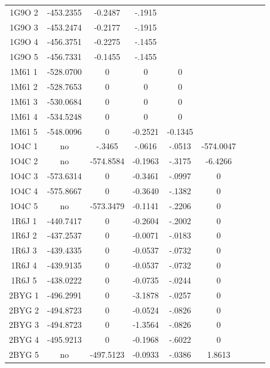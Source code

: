 \documentclass[a4paper,12pt]{article}
\begin{document}
\begin{table}[h]
\begin{tabular}{|c|c|c|c|c|c|c|c|c|}
        1G9O 2 & -453.2355 & -0.2487 & -.1915 \\      
        1G9O 3 & -453.2474 & -0.2177 & -.1915 \\      
        1G9O 4 & -456.3751 & -0.2275 & -.1455 \\      
        1G9O 5 & -456.7331 & -0.1455 & -.1455 \\      
        1M61 1 & -528.0700 & 0 & 0 & 0 \\             
        1M61 2 & -528.7653 & 0 & 0 & 0 \\             
        1M61 3 & -530.0684 & 0 & 0 & 0 \\             
        1M61 4 & -534.5248 & 0 & 0 & 0 \\             
        1M61 5 & -548.0096 & 0 & -0.2521 & -0.1345 \\ 
        1O4C 1 & no & -.3465 & -.0616 & -.0513 & -574.0047\\    
        1O4C 2 & no & -574.8584 & -0.1963 & -.3175 & -6.4266\\        
        1O4C 3 & -573.6314 & 0 & -0.3461 & -.0997 & 0 \\             
        1O4C 4 & -575.8667 & 0 & -0.3640 & -.1382 & 0 \\             
         1O4C 5 & no & -573.3479 & -0.1141 & -.2206 & 0 \\   
        1R6J 1 & -440.7417 & 0 & -0.2604 & -.2002 & 0 \\        
        1R6J 2 & -437.2537 & 0 & -0.0071 & -.0183 & 0 \\        
        1R6J 3 & -439.4335 & 0 & -0.0537 & -.0732 & 0 \\        
        1R6J 4 & -439.9135 & 0 & -0.0537 & -.0732 & 0 \\        
        1R6J 5 & -438.0222 & 0 & -0.0735 & -.0244 & 0 \\        
        2BYG 1 & -496.2991 & 0 & -3.1878 & -.0257 & 0 \\        
        2BYG 2 & -494.8723 & 0 & -0.0524 & -.0826 & 0 \\        
        2BYG 3 & -494.8723 & 0 & -1.3564 & -.0826 & 0 \\        
        2BYG 4 & -495.9213 & 0 & -0.1968 & -.6022 & 0 \\        
        2BYG 5 & no & -497.5123 & -0.0933 & -.0386 & 1.8613\\  
    
    \hline


 \end{tabular}      
 \label{tab_echec_10_20}      
\end{table}
\end{document}
